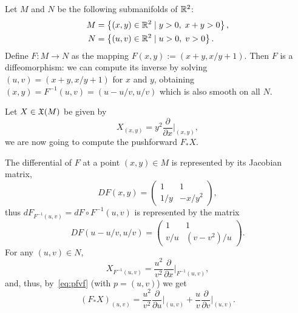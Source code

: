 \begin{example}
	Let $M$ and $N$ be the following submanifolds of $\mathbb{R}^2$:
	\begin{align}
		M & = \left\{(x,y)\in\mathbb{R}^2 \mid y>0,\; x+y>0\right\}, \\
		N & = \left\{(u,v)\in\mathbb{R}^2 \mid u>0,\; v>0 \right\}.
	\end{align}
	Define $F:M\to N$ as the mapping $F(x,y):=(x+y, x/y+1)$.
	Then $F$ is a diffeomorphism: we can compute its inverse by solving $(u,v)=(x+y, x/y+1)$ for $x$ and $y$, obtaining $(x,y)=F^{-1}(u,v)=(u-u/v, u/v)$ which is also smooth on all $N$.

	Let $X\in\mathfrak{X}(M)$ be given by
	\begin{equation}
		X_{(x,y)} = y^2\frac{\partial}{\partial x}\Big|_{(x,y)},
	\end{equation}
	we are now going to compute the pushforward $F_* X$.

	The differential of $F$ at a point $(x,y)\in M$ is represented by its Jacobian matrix,
	\begin{equation}
		DF(x,y) = \begin{pmatrix}
			1   & 1      \\
			1/y & -x/y^2
		\end{pmatrix},
	\end{equation}
	thus $dF_{F^{-1}(u,v)} = dF\circ F^{-1}(u,v)$ is represented by the matrix
	\begin{equation}
		DF(u-u/v, u/v) = \begin{pmatrix}
			1   & 1         \\
			v/u & (v-v^2)/u
		\end{pmatrix}.
	\end{equation}
	For any $(u,v)\in N$,
	\begin{equation}
		X_{F^{-1}(u,v)} = \frac{u^2}{v^2}\frac{\partial}{\partial x}\Big|_{F^{-1}(u,v)},
	\end{equation}
	and, thus, by~\eqref{eq:pfvf} (with $p=(u,v)$) we get
	\begin{equation}
		(F_*X)_{(u,v)} = \frac{u^2}{v^2}\frac{\partial}{\partial u}\Big|_{(u,v)} + \frac{u}{v}\frac{\partial}{\partial v}\Big|_{(u,v)}.
	\end{equation}
\end{example}

